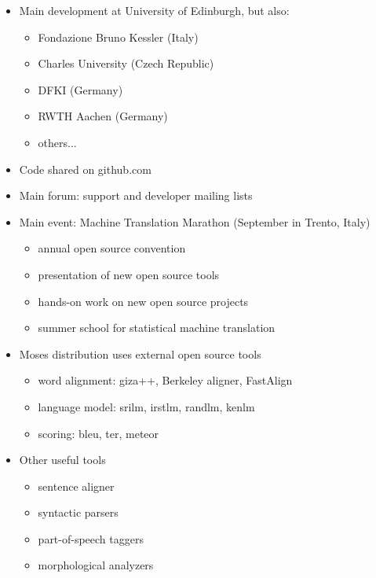 \documentclass[landscape]{uedslides2C}
\begin{document}
\begin{itemize} \itemsep -1mm
\item Main development at University of Edinburgh, but also: \vspace{-3mm}
\begin{itemize}
\item Fondazione Bruno Kessler (Italy)
\item Charles University (Czech Republic)
\item DFKI (Germany)
\item RWTH Aachen (Germany)
\item others...
\end{itemize}
\item Code shared on github.com
\item Main forum: support and developer mailing lists
\item Main event: Machine Translation Marathon (September in Trento, Italy)\vspace{-3mm}
\begin{itemize}
\item annual open source convention
\item presentation of new open source tools
\item hands-on work on new open source projects
\item summer school for statistical machine translation
\end{itemize}
\end{itemize}


\vspace{10mm}
\begin{itemize}
\item Moses distribution uses external open source tools
\begin{itemize}
\item word alignment: {\sc giza++}, Berkeley aligner, FastAlign
\item language model: {\sc srilm}, {\sc irstlm}, {\sc randlm}, {\sc kenlm}
\item scoring: {\sc bleu}, {\sc ter}, {\sc meteor}
\end{itemize}
\item Other useful tools
\begin{itemize}
\item sentence aligner
\item syntactic parsers
\item part-of-speech taggers
\item morphological analyzers
\end{itemize}
\end{itemize}
\end{document}
